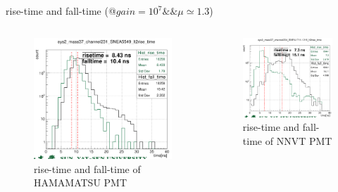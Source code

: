 \begin{frame}{rise-time and fall-time (@$gain=10^7\&\&\mu\simeq 1.3$)}
\begin{columns}
\begin{column}{.5\textwidth}
\begin{figure}
\centering
\includegraphics[width=\textwidth]{figures/hamrtft.png} %
\caption{rise-time and fall-time of HAMAMATSU PMT}
\end{figure}
\end{column}
\begin{column}{.5\textwidth}
\begin{figure}
\centering
\includegraphics[width=\textwidth]{figures/mcprtft.png} %
\caption{rise-time and fall-time of NNVT PMT}
\end{figure}
\end{column}
\end{columns}
\end{frame}
